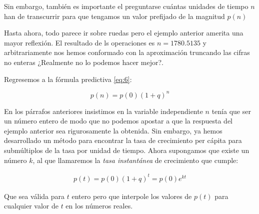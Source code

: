 Sin embargo, también es importante el preguntarse cuántas unidades de tiempo $n$ han de transcurrir para que tengamos un valor prefijado de la magnitud $p(n)$

\begin{exe}
\end{exe}

Hasta ahora, todo parece ir sobre ruedas pero el ejemplo anterior amerita una mayor reflexión. El resultado de ls operaciones es $n=1780.5135$ y arbitrariamente nos hemos conformado con la aproximación truncando las cifras no enteras ¿Realmente no lo podemos hacer mejor?. 

Regresemos a la fórmula predictiva \ref{eq:6}: 

\[
p(n)=p(0)(1+q)^n
\]

En los párrafos anteriores insistimos en la variable independiente $n$ tenía que ser un número entero de modo que no podemos apostar a que la respuesta del ejemplo anterior sea rigurosamente la obtenida. Sin embargo, ya hemos desarrollado un método para encontrar la tasa de crecimiento per cápita para submúltiplos de la tasa por unidad de tiempo. Ahora supongamos que existe un número $k$, al que llamaremos la \emph{tasa instantánea} de crecimiento que cumple:

\begin{align}
    p(t)=p(0)(1+q)^t=p(0)e^{kt}
\end{align}

Que sea válida para $t$ entero pero que interpole los valores de $p(t)$ para cualquier valor de $t$ en los números reales.












